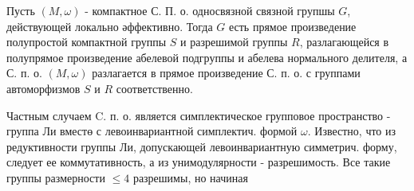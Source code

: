 \documentclass[10pt]{article}
\begin{document}
Пусть $(M, \omega)$ - компактное С. П. о. односвязной связной групшы $G$, действующей локально әффективно. Тогда $G$ есть прямое произведение полупростой компактной группы $S$ и разрешимой группы $R$, разлагающейся в полупрямое произведение абелевой подгруппы и абелева нормального делителя, а С. п. о. $(M, \omega)$ разлагается в прямое произведение С. п. о. с группами автоморфизмов $S$ и $R$ соответственно.



Частным случаем C. п. о. является симплектическое групповое пространство - группа Ли вместө с левоинвариантной симплектич. формой $\omega$. Известно, что из редуктивности группы Ли, допускающей левоинвариантную симметрич. форму, следует ее коммутативность, а из унимодулярности - разрешимость. Все такие группы размерности $\leqslant 4$ разрешимы, но начиная
\end{document}
